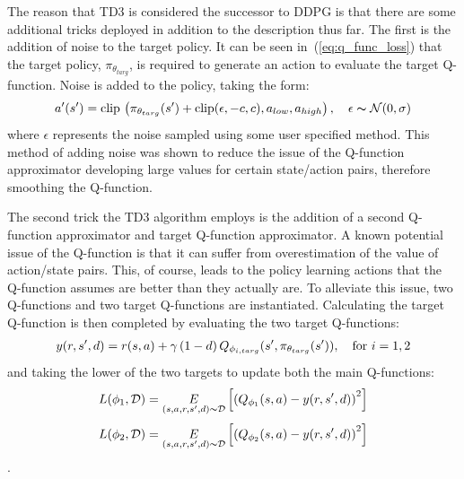 The reason that TD3 is considered the successor to DDPG is that there are some additional tricks deployed in addition to the description thus far. The first is the addition of noise to the target policy. It can be seen in~(\ref{eq:q_func_loss}) that the target policy, $\pi_{\theta_{targ}}$, is required to generate an action to evaluate the target Q-function. Noise is added to the policy, taking the form:
% 
\begin{equation}
  \label{eq:action_noise}
  \begin{aligned}
    a'(s') = \textup{clip} \, \left( \pi_{\theta_{targ}}(s') + \textup{clip}(\epsilon, -c, c), a_{low}, a_{high}  \right), ~~~ \epsilon \thicksim \mathcal{N}(0,\sigma)
  \end{aligned}
\end{equation}
% 
where $\epsilon$ represents the noise sampled using some user specified method. This method of adding noise was shown to reduce the issue of the Q-function approximator developing large values for certain state/action pairs, therefore smoothing the Q-function. 

The second trick the TD3 algorithm employs is the addition of a second Q-function approximator and target Q-function approximator. A known potential issue of the Q-function is that it can suffer from overestimation of the value of action/state pairs. This, of course, leads to the policy learning actions that the Q-function assumes are better than they actually are. To alleviate this issue, two Q-functions and two target Q-functions are instantiated. Calculating the target Q-function is then completed by evaluating the two target Q-functions:
% 
\begin{equation}
  \begin{aligned}
    y(r,s',d) = r(s,a) + \gamma \, (1-d) \, Q_{\phi_{i,targ}}(s', \pi_{\theta_{targ}}(s')),~~~ \textup{for}~i=1,2
  \end{aligned}
\end{equation}
% 
and taking the lower of the two targets to update both the main Q-functions:
% 
\begin{equation}
  \begin{aligned}
    L(\phi_1, \mathcal{D}) = \underset{(s,a,r,s',d) \thicksim \mathcal{D}}{E} \left[ \left( Q_{\phi_1}(s,a) - y(r,s',d) \right)^2 \right]
  \end{aligned}
\end{equation}
% 
\begin{equation}
  \begin{aligned}
    L(\phi_2, \mathcal{D}) = \underset{(s,a,r,s',d) \thicksim \mathcal{D}}{E} \left[ \left( Q_{\phi_2}(s,a) - y(r,s',d) \right)^2 \right]
  \end{aligned}
\end{equation}.
% 

